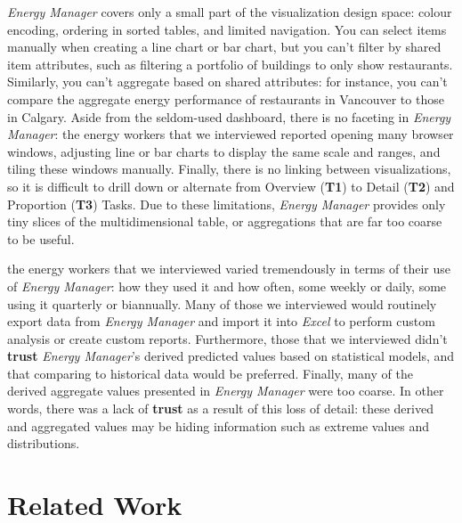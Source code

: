 \documentclass[journal]{vgtc}                %
\newcommand{\bstart}[1]{\vspace{1mm} \noindent{\textbf{#1:}}}
\begin{document}
{\it Energy Manager} covers only a small part of the visualization design space: colour encoding, ordering in sorted tables, and limited navigation.
You can select items manually when creating a line chart or bar chart, but you can't filter by shared item attributes, such as filtering a portfolio of buildings to only show restaurants.
Similarly, you can't aggregate based on shared attributes: for instance, you can't compare the aggregate energy performance of restaurants in Vancouver to those in Calgary.
Aside from the seldom-used dashboard, there is no faceting in {\it Energy Manager}: the energy workers that we interviewed reported opening many browser windows, adjusting line or bar charts to display the same scale and ranges, and tiling these windows manually.
Finally, there is no linking between visualizations, so it is difficult to drill down or alternate from Overview ({\bf T1}) to Detail ({\bf T2}) and Proportion ({\bf T3}) Tasks.
Due to these limitations, {\it Energy Manager} provides only tiny slices of the multidimensional table, or aggregations that are far too coarse to be useful.

\bstart{Interview observations} the energy workers that we interviewed varied tremendously in terms of their use of {\it Energy Manager}: how they used it and how often, some weekly or daily, some using it quarterly or biannually.
Many of those we interviewed would routinely export data from {\it Energy Manager} and import it into {\it Excel} to perform custom analysis or create custom reports.
Furthermore, those that we interviewed didn't {\bf trust} {\it Energy Manager}'s derived predicted values based on statistical models, and that comparing to historical data would be preferred.
Finally, many of the derived aggregate values presented in {\it Energy Manager} were too coarse. In other words, there was a lack of {\bf trust} as a result of this loss of detail: these derived and aggregated values may be hiding information such as extreme values and distributions.


\section{Related Work}
\label{related-work}

\end{document}
